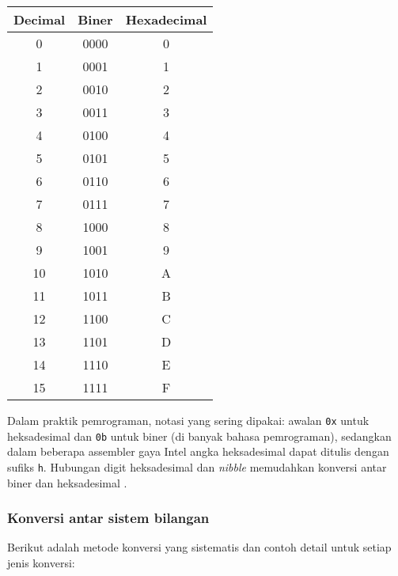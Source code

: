 \documentclass[../main.tex]{subfiles}
\begin{document}
\begin{center}
\begin{tabular}{|c|c|c|}
\hline
\textbf{Decimal} & \textbf{Biner} & \textbf{Hexadecimal} \\
\hline
0 & 0000 & 0 \\
1 & 0001 & 1 \\
2 & 0010 & 2 \\
3 & 0011 & 3 \\
4 & 0100 & 4 \\
5 & 0101 & 5 \\
6 & 0110 & 6 \\
7 & 0111 & 7 \\
8 & 1000 & 8 \\
9 & 1001 & 9 \\
10 & 1010 & A \\
11 & 1011 & B \\
12 & 1100 & C \\
13 & 1101 & D \\
14 & 1110 & E \\
15 & 1111 & F \\
\hline
\end{tabular}
\end{center}

Dalam praktik pemrograman, notasi yang sering dipakai: awalan \texttt{0x} untuk heksadesimal dan \texttt{0b} untuk biner (di banyak bahasa pemrograman), sedangkan dalam beberapa assembler gaya Intel angka heksadesimal dapat ditulis dengan sufiks \texttt{h}. Hubungan digit heksadesimal dan \textit{nibble} memudahkan konversi antar biner dan heksadesimal \cite{wiki_hexadecimal}.

\subsubsection{Konversi antar sistem bilangan}

Berikut adalah metode konversi yang sistematis dan contoh detail untuk setiap jenis konversi:
\end{document}
